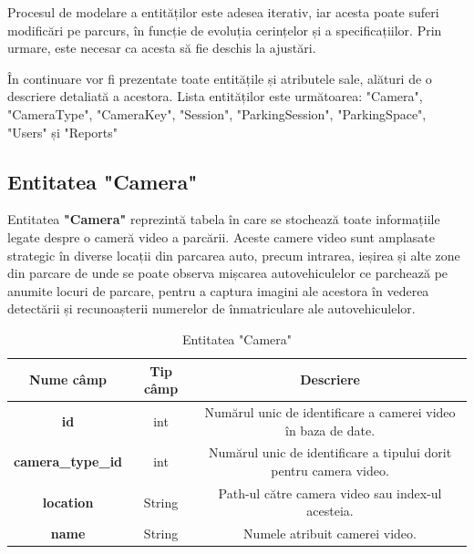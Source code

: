 \documentclass[12pt]{article}
\begin{document}
Procesul de modelare a entit\u{a}ților este adesea iterativ, iar acesta poate suferi modific\u{a}ri pe parcurs, \^{i}n funcție de evoluția cerințelor și a specificațiilor. Prin urmare, este necesar ca acesta s\u{a} fie deschis la ajust\u{a}ri.

\^{I}n continuare vor fi prezentate toate entit\u{a}țile și atributele sale, al\u{a}turi de o descriere detaliat\u{a} a acestora. Lista entit\u{a}ților este urm\u{a}toarea: "Camera", "CameraType", "CameraKey", "Session", "ParkingSession", "ParkingSpace", "Users" și "Reports"

\subsection{Entitatea "Camera"}

Entitatea \textbf{"Camera"} reprezint\u{a} tabela \^{i}n care se stocheaz\u{a} toate informațiile legate despre o camer\u{a} video a parc\u{a}rii. Aceste camere video sunt amplasate strategic \^{i}n diverse locații din parcarea auto, precum intrarea, ieșirea și alte zone din parcare de unde se poate observa mișcarea autovehiculelor ce parcheaz\u{a} pe anumite locuri de parcare, pentru a captura imagini ale acestora \^{i}n vederea detect\u{a}rii și recunoașterii numerelor de \^{i}nmatriculare ale autovehiculelor.

\begin{table}[h]
\centering
\begin{tabular}{|c|c|c|}
\hline
\textbf{Nume c\^{a}mp}  & \textbf{Tip c\^{a}mp} & \textbf{Descriere} \\
\hline
\textbf{id} & int & Num\u{a}rul unic de identificare a camerei video \^{i}n baza de date.  \\
\hline
\textbf{camera\_type\_id} & int & Num\u{a}rul unic de identificare a tipului dorit pentru camera video.  \\
\hline
\textbf{location} & String & Path-ul c\u{a}tre camera video sau index-ul acesteia. \\
\hline
\textbf{name} & String & Numele atribuit camerei video. \\
\hline
\end{tabular}
\caption{Entitatea "Camera"}
\end{table}
\end{document}
